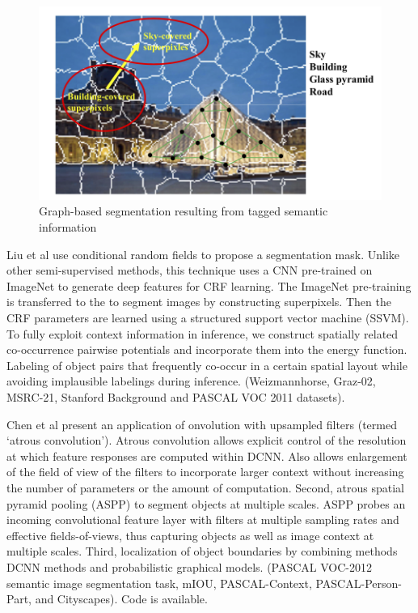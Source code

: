 \documentclass[letterpaper, 10 pt, conference]{ieeeconf}  %
\begin{document}
\begin{figure}
  \includegraphics[width=\linewidth]{images/ZhangGraphed.png}
  \caption{Graph-based segmentation resulting from tagged semantic information \cite{zhang2014representative}}
  \label{fig:zhanggraph}
\end{figure}

Liu et al use \cite{liu2015crf} conditional random fields to propose a segmentation mask. Unlike other semi-supervised methods, this technique uses a CNN pre-trained on ImageNet to generate deep features for CRF learning. The ImageNet pre-training is transferred to the to segment images by constructing superpixels. Then the CRF parameters are learned using a structured support vector machine (SSVM). To fully exploit context information in inference, we construct spatially related co-occurrence pairwise potentials and incorporate them into the energy function. Labeling of object pairs that frequently co-occur in a certain spatial layout while avoiding implausible labelings during inference. (Weizmannhorse, Graz-02, MSRC-21, Stanford Background and PASCAL VOC 2011 datasets).

Chen et al \cite{chen_deeplab:_2018} present an application of onvolution with upsampled filters (termed ‘atrous convolution’).  Atrous convolution allows explicit control of the resolution at which feature responses are computed within DCNN. Also allows enlargement of the field of view of the filters to incorporate larger context without increasing the number of parameters or the amount of computation. Second, atrous spatial pyramid pooling (ASPP) to segment objects at multiple scales. ASPP probes an incoming convolutional feature layer with filters at multiple sampling rates and effective fields-of-views, thus capturing objects as well as image context at multiple scales. Third, localization of object boundaries by combining methods DCNN methods and probabilistic graphical models. (PASCAL VOC-2012 semantic image segmentation task, mIOU, PASCAL-Context, PASCAL-Person-Part, and Cityscapes). Code is available.
\end{document}
